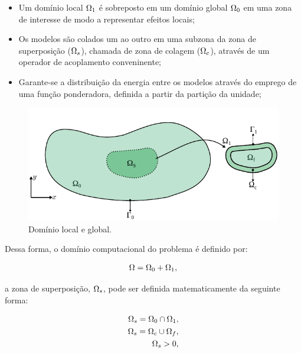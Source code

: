 \documentclass[tese_patricia]{subfiles}
\begin{document}
\begin{itemize}
	\item Um domínio local $\Omega_1$ é sobreposto em um domínio global  $\Omega_0$ em uma zona de interesse de modo a representar efeitos locais;
	\item Os modelos são colados um ao outro em uma subzona da zona de superposição ($\Omega_s$), chamada de zona de colagem ($\Omega_c$), através de um operador de acoplamento conveninente;
	\item  Garante-se a distribuição da energia entre os modelos através do emprego de uma função ponderadora, definida a partir da partição da unidade;
\end{itemize}

\begin{figure}[htb!]
	\centering 
	\includegraphics[scale=1.0,trim=0cm 0cm 0cm 0.0cm, clip=true]{Imagens/Cap6/dominioArlequin.pdf}	
	\caption{Domínio local e global.}
	\label{fig:DomLocalGlobal}
\end{figure}

Dessa forma, o domínio computacional do problema é definido por:

\begin{align}
	\Omega = \Omega_0 + \Omega_1, 
\end{align}

\noindent a zona de superposição, $\Omega_s$, pode ser definida matematicamente da seguinte forma:

\begin{align}
	\Omega_s = \Omega_0 \cap \Omega_1, \\
	\Omega_s = \Omega_c \cup \Omega_f, \\
	\Omega_s > 0, 
\end{align}
\end{document}

